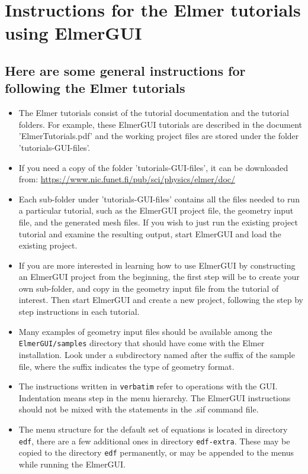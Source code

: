 \chapter*{Instructions for the Elmer tutorials using ElmerGUI}

\section*{Here are some general instructions for following the Elmer tutorials}

\begin{itemize}
\item The Elmer tutorials consist of the tutorial documentation and the tutorial folders.  For example, these ElmerGUI tutorials are described in the document 'ElmerTutorials.pdf' and the working project files are stored under the folder 'tutorials-GUI-files'.
%
\item If you need a copy of the folder 'tutorials-GUI-files', it can be downloaded from:  \url{https://www.nic.funet.fi/pub/sci/physics/elmer/doc/}  
%
\item Each sub-folder under 'tutorials-GUI-files' contains all the files needed to run a particular tutorial, such as the ElmerGUI project file, the geometry input file, and the generated mesh files.  If you wish to just run the existing project tutorial and examine the resulting output, start ElmerGUI and load the existing project.
%
\item If you are more interested in learning how to use ElmerGUI by constructing an ElmerGUI project from the beginning, the first step will be to create your own sub-folder, and copy in the geometry input file from the tutorial of interest.  Then start ElmerGUI and create a new project, following the step by step instructions in each tutorial.
%
\item Many examples of geometry input files should be available among the \texttt{ElmerGUI/samples} directory that should have come with the Elmer installation. Look under a subdirectory named after the suffix of the sample file, where the suffix indicates the type of geometry format.
%
\item The instructions written in \texttt{verbatim} refer to operations with the GUI. Indentation means step in the menu hierarchy.  The ElmerGUI instructions should not be mixed with the statements in the .sif command file. 
%
\item The menu structure for the default set of equations is located in directory \texttt{edf}, there are a few additional ones in directory \texttt{edf-extra}. These may be copied to the directory \texttt{edf} permanently, or may be appended to the menus while running the ElmerGUI. 

\end{itemize}
